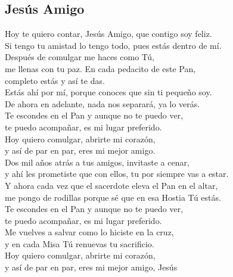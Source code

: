 \subsection{Jesús Amigo}

\begin{center}

{\Large
Hoy te quiero contar, Jesús Amigo, que contigo soy feliz.\\
Si tengo tu amistad lo tengo todo, pues estás dentro de mí.\\
\vspace{1em}
Después de comulgar me haces como Tú,\\
me llenas con tu paz. En cada pedacito de este Pan,\\
completo estás y así te das.\\
\vspace{1em}
Estás ahí por mí, porque conoces que sin ti pequeño soy.\\
De ahora en adelante, nada nos separará, ya lo verás.\\
\vspace{1em}
Te escondes en el Pan y aunque no te puedo ver,\\
te puedo acompañar, es mi lugar preferido.\\
Hoy quiero comulgar, abrirte mi corazón,\\
y así de par en par, eres mi mejor amigo.\\
\vspace{1em}
Dos mil años atrás a tus amigos, invitaste a cenar,\\
y ahí les prometiste que con ellos, tu por siempre vas a estar.\\
Y ahora cada vez que el sacerdote eleva el Pan en el altar,\\
me pongo de rodillas porque sé que en esa Hostia Tú estás.\\
\vspace{1em}
Te escondes en el Pan y aunque no te puedo ver,\\
te puedo acompañar, es mi lugar preferido.\\
Me vuelves a salvar como lo hiciste en la cruz,\\
y en cada Misa Tú renuevas tu sacrificio.\\
\vspace{1em}
Hoy quiero comulgar, abrirte mi corazón,\\
y así de par en par, eres mi mejor amigo, Jesús
}
\end{center}


